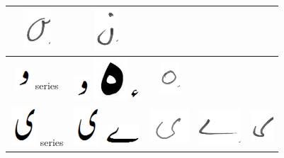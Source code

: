 \documentclass[a4paper,conference]{IEEEtran}
\begin{document}
\begin{table}[h]
\begin{tabular}{@{}ccccc@{}}
\includegraphics[scale=0.20]{34} &  
\includegraphics[scale=0.20]{35}  \\
\hline
\includegraphics[scale=0.20]{wao_orig} series & \includegraphics[scale=0.25]{wao_orig}
\includegraphics[scale= 0.15]{haey_orig}
\includegraphics[scale=0.35]{hamza} & \includegraphics[scale=0.25]{36} & &  \\
\hline
\includegraphics[scale=0.15]{choti_ye_orig} series & \includegraphics[scale=0.15]{choti_ye_orig} \includegraphics[scale=0.20]{bari_ye} &\includegraphics[scale=0.20]{37} &
\includegraphics[scale=0.20]{38} & 
\includegraphics[scale=0.20]{39} \\ 
\hline
\end{tabular}
\end{table}
\end{document}

